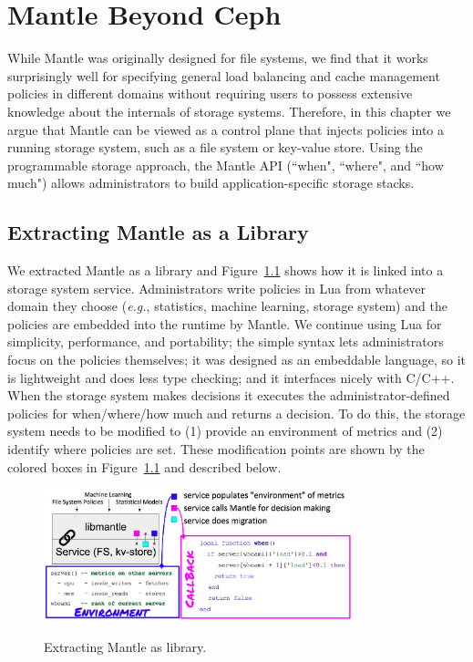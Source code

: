 \chapter{Mantle Beyond Ceph}
\label{chp:mantle-beyond}

While Mantle was originally designed for file systems, we find that it works
surprisingly well for specifying general load balancing and cache management
policies in different domains without requiring users to possess extensive
knowledge about the internals of storage systems.  Therefore, in this chapter
we argue that Mantle can be viewed as a control plane that injects policies
into a running storage system, such as a file system or key-value store. Using
the programmable storage approach, the Mantle API (``when", ``where", and ``how
much") allows administrators to build application-specific storage stacks.

\section{Extracting Mantle as a Library}
\label{sec:extracting}

We extracted Mantle as a library and Figure~\ref{fig:mantle} shows how it is
linked into a storage system service.  Administrators write policies in Lua
from whatever domain they choose ({\it e.g.}, statistics, machine learning,
storage system) and the policies are embedded into the runtime by Mantle.  We
continue using Lua for simplicity, performance, and portability; the simple
syntax lets administrators focus on the policies themselves; it was designed as
an embeddable language, so it is lightweight and does less type checking; and
it interfaces nicely with C/C++.  When the storage system makes decisions it
executes the administrator-defined policies for when/where/how much and returns
a decision.  To do this, the storage system needs to be modified to (1) provide
an environment of metrics and (2) identify where policies are set.  These
modification points are shown by the colored boxes in Figure~\ref{fig:mantle}
and described below.

\begin{figure}[t]
  \centering
  \includegraphics[width=0.8\textwidth]{./chapters/controlplane/parsplice/figures/mantle.png}\\

  \caption{Extracting Mantle as library.\label{fig:mantle}}

\end{figure}

